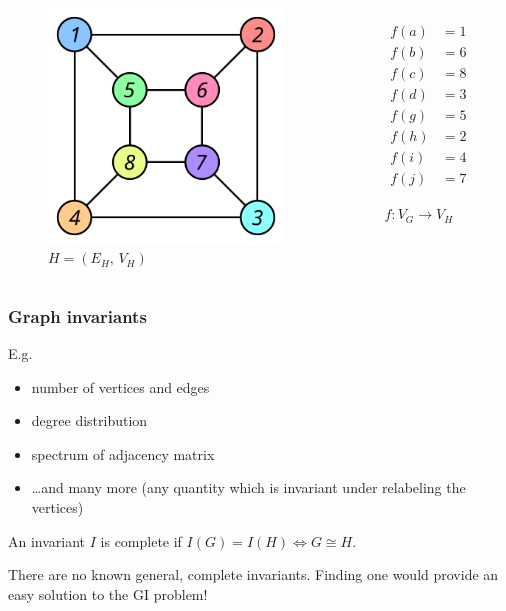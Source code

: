 \documentclass[handout]{beamer}
\begin{document}
\begin{frame}
\begin{columns}[b]
    \begin{figure}
      \includegraphics[scale=0.36]{Graph_isomorphism_b}
      \vskip 1cm
      \caption{$H=(E_H,\,V_H)$}
    \end{figure}

    \begin{figure}
      \abovedisplayskip=0pt
      \abovedisplayshortskip=0pt
      \begin{align*}
        f(a) &= 1 \\
        f(b) &= 6 \\
        f(c) &= 8 \\
        f(d) &= 3 \\
        f(g) &= 5 \\
        f(h) &= 2 \\
        f(i) &= 4 \\
        f(j) &= 7
      \end{align*}
      \caption{$f:V_G \longrightarrow V_H$}
    \end{figure}
  \end{columns}
\end{frame}
\begin{frame}
  \frametitle{Graph invariants}
  E.g.
  \begin{itemize}
    \item number of vertices and edges
    \item degree distribution
    \item spectrum of adjacency matrix
    \item \ldots and many more (any quantity which is invariant under
      relabeling the vertices)
  \end{itemize}
  \begin{definition}
    An invariant $I$ is \alert{complete} if $I(G) = I(H) \iff G \cong H$.
  \end{definition}
  There are no known general, complete invariants. Finding one would provide an
  easy solution to the GI problem!
\end{frame}
\end{document}
